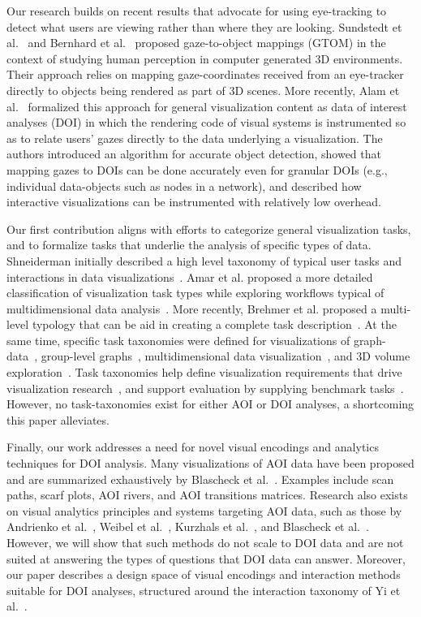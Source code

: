 Our research builds on recent results that advocate for using eye-tracking to detect what users are viewing rather than where they are looking. Sundstedt et al.~\cite{sundstedt2013visual} and Bernhard et al.~\cite{bernhard2014gaze} proposed gaze-to-object mappings (GTOM) in the context of studying human perception in computer generated 3D environments. Their approach relies on mapping gaze-coordinates received from an eye-tracker directly to objects being rendered as part of 3D scenes. More recently, Alam et al.~\cite{alam15analyzing} formalized this approach for general visualization content as data of interest analyses (DOI) in which the rendering code of visual systems is instrumented so as to relate users' gazes directly to the data underlying a visualization. The authors introduced an algorithm for accurate object detection, showed that mapping gazes to DOIs can be done accurately even for granular DOIs (e.g., individual data-objects such as nodes in a network), and described how interactive visualizations can be instrumented with relatively low overhead.

Our first contribution aligns with efforts to categorize general visualization tasks, and to formalize tasks that underlie the analysis of specific types of data. Shneiderman initially described a high level taxonomy of typical user tasks and interactions in data visualizations~\cite{shneiderman1996eyes}. Amar et al. proposed a more detailed classification of visualization task types while exploring workflows typical of multidimensional data analysis~\cite{amar2005low}.  More recently, Brehmer et al. proposed a multi-level typology that can be aid in creating a complete task description~\cite{brehmer2013multi}. At the same time, specific task taxonomies were defined for visualizations of graph-data~\cite{lee2006task}, group-level graphs~\cite{saket2014group}, multidimensional data  visualization~\cite{ward2002taxonomy}, and 3D volume exploration~\cite{lahaclassification}. Task taxonomies help define visualization requirements that drive visualization research~\cite{amar2005low},  and support evaluation by supplying benchmark tasks~\cite{okoe2015graphunit,jianu2014display,saket2014group,ghoniem2004comparison}. However, no task-taxonomies exist for either AOI or DOI analyses, a shortcoming this paper alleviates.   
 
Finally, our work addresses a need for novel visual encodings and analytics techniques for DOI analysis. Many visualizations of AOI data have been proposed and are summarized exhaustively by Blascheck et al.~\cite{blascheck2014state}.  Examples include scan paths, scarf plots, AOI rivers, and AOI transitions matrices. Research also exists on visual analytics principles and systems targeting AOI data, such as those by Andrienko et al.~\cite{andrienko2012visual}, Weibel et al.~\cite{weibel2012let}, Kurzhals et al.~\cite{kurzhals2014iseecube}, and Blascheck et al.~\cite{blascheck2014state}. However, we will show that such methods do not scale to DOI data and are not suited at answering the types of questions that DOI data can answer. Moreover, our paper describes a design space of visual encodings and interaction methods suitable for DOI analyses, structured around the interaction taxonomy of Yi et al.~\cite{yi2007toward}.


